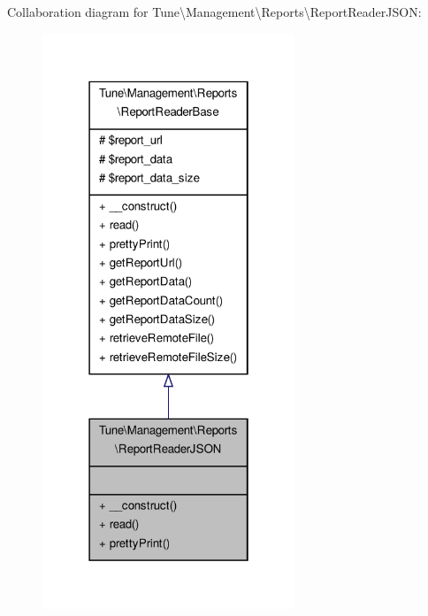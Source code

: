 Collaboration diagram for Tune\textbackslash{}Management\textbackslash{}Reports\textbackslash{}Report\-Reader\-J\-S\-O\-N\-:
\nopagebreak
\begin{figure}[H]
\begin{center}
\leavevmode
\includegraphics[width=214pt]{classTune_1_1Management_1_1Reports_1_1ReportReaderJSON__coll__graph}
\end{center}
\end{figure}
